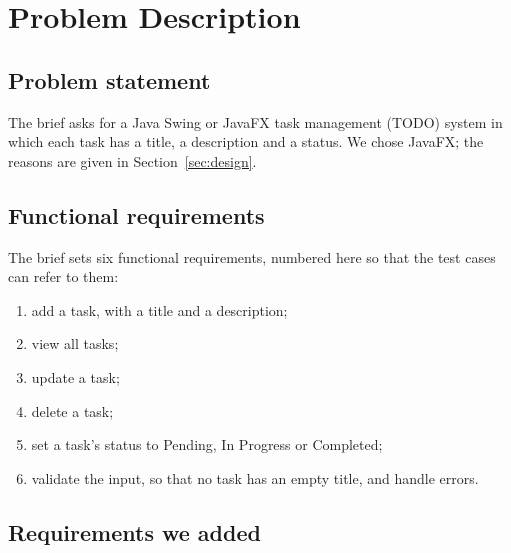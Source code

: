 \section{Problem Description}\label{sec:problem}

\subsection{Problem statement}

The brief asks for a Java Swing or JavaFX task management (TODO) system in which each task has a title, a description
and a status. We chose JavaFX; the reasons are given in Section~\ref{sec:design}.

\subsection{Functional requirements}

The brief sets six functional requirements, numbered here so that the test cases can refer to them:
\begin{enumerate}
  \renewcommand{\labelenumi}{FR\arabic{enumi}}
  \item add a task, with a title and a description;
  \item view all tasks;
  \item update a task;
  \item delete a task;
  \item set a task's status to Pending, In Progress or Completed;
  \item validate the input, so that no task has an empty title, and handle errors.
\end{enumerate}

\subsection{Requirements we added}

